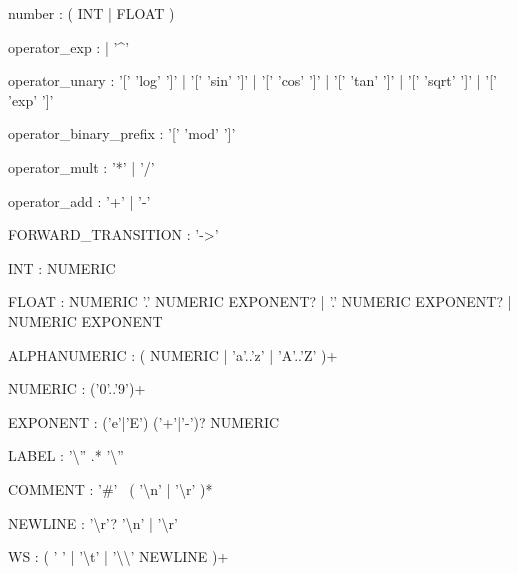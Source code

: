 \begin{bnfsource}
number :
  ( INT | FLOAT )
  

operator_exp :
  | '^'

operator_unary :
  '[' 'log' ']'
  | '[' 'sin' ']'
  | '[' 'cos' ']'
  | '[' 'tan' ']'
  | '[' 'sqrt' ']'
  | '[' 'exp' ']'

operator_binary_prefix :
  '[' 'mod' ']'

operator_mult :
  '*' | '/'

operator_add :
  '+' | '-'


FORWARD_TRANSITION :
  '->'

INT :
  NUMERIC

FLOAT :
  NUMERIC '.' NUMERIC EXPONENT?
  | '.' NUMERIC EXPONENT?
  | NUMERIC EXPONENT

ALPHANUMERIC :
  ( NUMERIC | 'a'..'z' | 'A'..'Z' )+

NUMERIC :
  ('0'..'9')+
  
EXPONENT :
  ('e'|'E') ('+'|'-')? NUMERIC

LABEL :
  '{\textbackslash}'' .* '{\textbackslash}''

COMMENT :
  '#' ~( '{\textbackslash}n' | '{\textbackslash}r' )*

NEWLINE :
  '{\textbackslash}r'? '{\textbackslash}n' | '{\textbackslash}r'

WS :
  ( ' ' | '{\textbackslash}t' | '{\textbackslash}{\textbackslash}' NEWLINE )+
\end{bnfsource}
